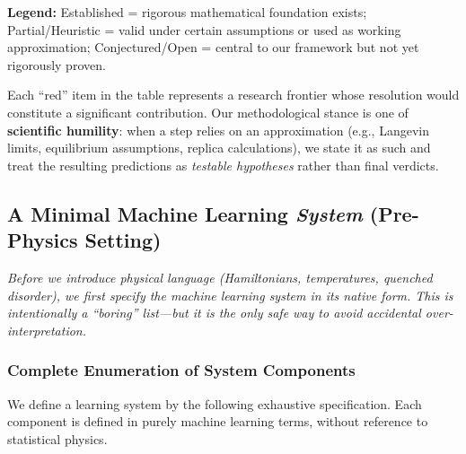 \documentclass[
  journal=largetwo,
  year=2025,
  volume=37,
]{cup-journal}
\begin{document}
\noindent\textbf{Legend:} \textcolor{green!60!black}{Established} = rigorous mathematical foundation exists; \textcolor{orange!80!black}{Partial/Heuristic} = valid under certain assumptions or used as working approximation; \textcolor{red!70!black}{Conjectured/Open} = central to our framework but not yet rigorously proven.

Each ``red'' item in the table represents a research frontier whose resolution would constitute a significant contribution. Our methodological stance is one of \textbf{scientific humility}: when a step relies on an approximation (e.g., Langevin limits, equilibrium assumptions, replica calculations), we state it as such and treat the resulting predictions as \textit{testable hypotheses} rather than final verdicts.

\subsection{A Minimal Machine Learning \textit{System} (Pre-Physics Setting)}\label{sec:ml_system_pre_physics}

\textit{Before we introduce physical language (Hamiltonians, temperatures, quenched disorder), we first specify the machine learning system \emph{in its native form}. This is intentionally a ``boring'' list---but it is the only safe way to avoid accidental over-interpretation.}


\subsubsection{Complete Enumeration of System Components}

We define a learning system by the following exhaustive specification. Each component is defined in purely machine learning terms, without reference to statistical physics.
\end{document}
